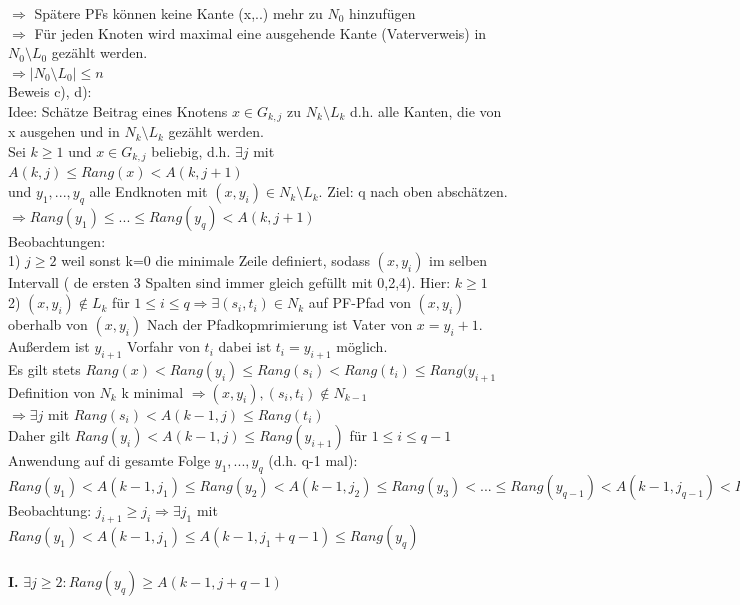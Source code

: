 \documentclass[a4paper]{article}
\begin{document}
$\Rightarrow$ Spätere PFs können keine Kante (x,..) mehr zu $N_0$ hinzufügen\\
$\Rightarrow$ Für jeden Knoten wird maximal eine ausgehende Kante (Vaterverweis) in $N_0\setminus L_0$ gezählt werden.\\
$\Rightarrow |N_0\setminus L_0| \leq n$\\
Beweis c), d):\\
Idee: Schätze Beitrag eines Knotens $x\in G_{k,j}$ zu $N_k\setminus L_k$ d.h. alle Kanten, die von x ausgehen und in $N_k\setminus L_k$ gezählt werden.\\
Sei $k\geq 1$ und $x\in G_{k,j}$ beliebig, d.h. $\exists j$ mit $ A(k,j) \leq Rang(x) < A(k,j+1)$\\
und $y_1,...,y_q$ alle Endknoten mit $(x,y_i)\in N_k\setminus L_k$. Ziel: q nach oben abschätzen.\\
$\Rightarrow Rang(y_1)\leq ...\leq Rang(y_q)<A(k,j+1)$\\
Beobachtungen:\\
1) $j\geq 2$ weil sonst k=0 die minimale Zeile definiert, sodass $(x,y_i)$ im selben Intervall ( de ersten 3 Spalten sind immer gleich gefüllt mit 0,2,4). Hier: $k\geq 1$\\
2) $(x,y_i)\not\in L_k$ für $1\leq i\leq q \Rightarrow \exists (s_i,t_i)\in N_k$ auf PF-Pfad von $(x,y_i)$ oberhalb von $(x,y_i)$
Nach der Pfadkopmrimierung ist Vater von $x=y_i+1$. Außerdem ist $y_{i+1}$ Vorfahr von $t_i$ dabei ist $t_i = y_{i+1}$ möglich.\\
Es gilt stets $Rang(x) < Rang(y_i)\leq Rang(s_i) < Rang(t_i) \leq Rang(y_{i+1}$\\
Definition von $N_k$ k minimal $\Rightarrow (x,y_i),(s_i,t_i)\not\in N_{k-1}$\\
$\Rightarrow \exists j$ mit $Rang(s_i) < A(k-1,j) \leq Rang(t_i)$\\
Daher gilt $Rang(y_i) < A(k-1,j)\leq Rang(y_{i+1})$ für $1\leq i \leq q-1$\\
Anwendung auf di gesamte Folge $y_1,...,y_q$ (d.h. q-1 mal):\\
$Rang(y_1)<A(k-1,j_1)\leq Rang(y_2)<A(k-1,j_2)\leq Rang(y_3)<...\leq Rang(y_{q-1}) < A(k-1,j_{q-1})<Rang(y_q)$\\
Beobachtung: $j_{i+1} \geq j_i \Rightarrow \exists j_1$ mit $Rang(y_1)<A(k-1,j_1)\leq A(k-1,j_1+q-1)\leq Rang(y_q)$\\
$ $\\
\textbf{I.} $\exists j\geq 2: Rang(y_q)\geq A(k-1,j+q-1)$\\
\end{document}
